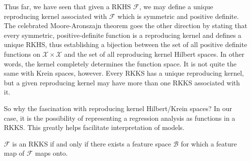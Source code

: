 Thus far, we have seen that given a RKHS $\mathcal F$, we may define a unique reproducing kernel associated with $\mathcal F$ which is symmetric and positive definite. The celebrated Moore-Aronszajn theorem goes the other direction by stating that every symmetric, positive-definite function is a reproducing kernel and defines a unique RKHS, thus establishing a bijection between the set of all positive definite functions on $\mathcal X \times \mathcal X$ and the set of all reproducing kernel Hilbert spaces. In other words, the kernel completely determines the function space. It is not quite the same with Krein spaces, however. Every RKKS has a unique reproducing kernel, but a given reproducing kernel may have more than one RKKS associated with it.


So why the fascination with reproducing kernel Hilbert/Krein spaces? In our case, it is the possibility of representing a regression analysis as functions in a RKKS. This greatly helps facilitate interpretation of models.

\begin{lemma}
	$\mathcal F$ is an RKKS if and only if there exists a feature space $\mathcal B$ for which a feature map of $\mathcal F$ maps onto. 
\end{lemma}

